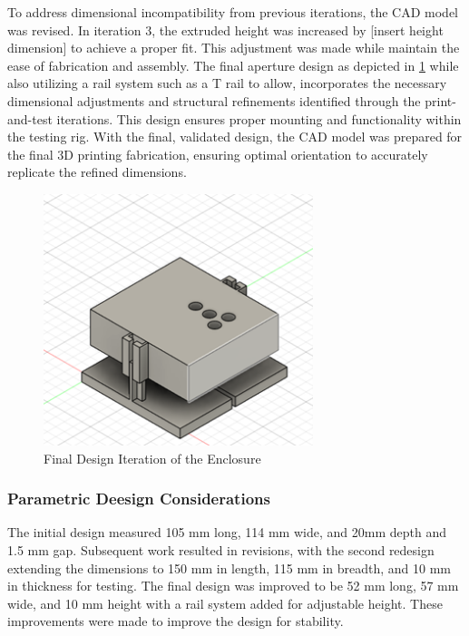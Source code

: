 To address dimensional incompatibility from previous iterations, the CAD model was revised. 
In iteration 3, the extruded height was increased by [insert height dimension] to achieve a proper fit. 
This adjustment was made while maintain the ease of fabrication and assembly.
The final aperture design as depicted in \ref{fig:CADFinal} while also utilizing a rail system such as a T rail to allow, incorporates the necessary dimensional adjustments and structural refinements identified through the print-and-test iterations. 
This design ensures proper mounting and functionality within the testing rig. 
With the final, validated design, the CAD model was prepared for the final 3D printing fabrication, ensuring optimal orientation to accurately replicate the refined dimensions.

\begin{figure}[htbp]
    \centering
    \includegraphics[width=0.7\textwidth]{figures/CAD-3DPrint/FinalCAD.png}
    \caption{Final Design Iteration of the Enclosure}
    \label{fig:CADFinal}
\end{figure}

\subsubsection{Parametric Deesign Considerations}
The initial design measured 105 mm long, 114 mm wide, and 20mm depth and 1.5 mm gap. 
Subsequent work resulted in revisions, with the second redesign extending the dimensions to 150 mm in length, 115 mm in breadth, and 10 mm in thickness for testing. 
The final design was improved to be 52 mm long, 57 mm wide, and 10 mm height with a rail system added for adjustable height. 
These improvements were made to improve the design for stability.

